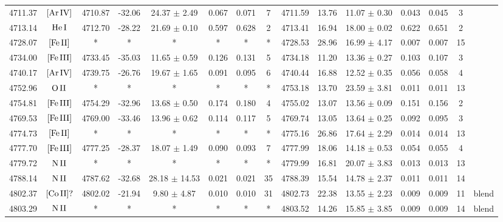 \documentclass{article}
\begin{document}
\begin{table*}
\begin{adjustbox}{width=\textwidth}
\begin{tabular}{ccccccccccccccc}
4711.37 & $\mbox{[Ar}\thinspace \mbox{IV]}$ & 4710.87 & -32.06 & 24.37 $\pm$ 2.49 & 0.067 & 0.071 & 7 & 4711.59 & 13.76 & 11.07 $\pm$ 0.30 & 0.043 & 0.045 & 3 &  \\
4713.14 & $\mbox{He}\thinspace \mbox{I}$ & 4712.70 & -28.22 & 21.69 $\pm$ 0.10 & 0.597 & 0.628 & 2 & 4713.41 & 16.94 & 18.00 $\pm$ 0.02 & 0.622 & 0.651 & 2 &  \\
4728.07 & $\mbox{[Fe}\thinspace \mbox{II]}$ & * & * & * & * & * & * & 4728.53 & 28.96 & 16.99 $\pm$ 4.17 & 0.007 & 0.007 & 15 &  \\
4734.00 & $\mbox{[Fe}\thinspace \mbox{III]}$ & 4733.45 & -35.03 & 11.65 $\pm$ 0.59 & 0.126 & 0.131 & 5 & 4734.18 & 11.20 & 13.36 $\pm$ 0.27 & 0.103 & 0.107 & 3 &  \\
4740.17 & $\mbox{[Ar}\thinspace \mbox{IV]}$ & 4739.75 & -26.76 & 19.67 $\pm$ 1.65 & 0.091 & 0.095 & 6 & 4740.44 & 16.88 & 12.52 $\pm$ 0.35 & 0.056 & 0.058 & 4 &  \\
4752.96 & $\mbox{O}\thinspace \mbox{II}$ & * & * & * & * & * & * & 4753.18 & 13.70 & 23.59 $\pm$ 3.81 & 0.011 & 0.011 & 13 &  \\
4754.81 & $\mbox{[Fe}\thinspace \mbox{III]}$ & 4754.29 & -32.96 & 13.68 $\pm$ 0.50 & 0.174 & 0.180 & 4 & 4755.02 & 13.07 & 13.56 $\pm$ 0.09 & 0.151 & 0.156 & 2 &  \\
4769.53 & $\mbox{[Fe}\thinspace \mbox{III]}$ & 4769.00 & -33.46 & 13.96 $\pm$ 0.62 & 0.114 & 0.117 & 5 & 4769.74 & 13.05 & 13.64 $\pm$ 0.25 & 0.092 & 0.095 & 3 &  \\
4774.73 & $\mbox{[Fe}\thinspace \mbox{II]}$ & * & * & * & * & * & * & 4775.16 & 26.86 & 17.64 $\pm$ 2.29 & 0.014 & 0.014 & 13 &  \\
4777.70 & $\mbox{[Fe}\thinspace \mbox{III]}$ & 4777.25 & -28.37 & 18.07 $\pm$ 1.49 & 0.090 & 0.093 & 7 & 4777.99 & 18.06 & 14.18 $\pm$ 0.53 & 0.054 & 0.055 & 4 &  \\
4779.72 & $\mbox{N}\thinspace \mbox{II}$ & * & * & * & * & * & * & 4779.99 & 16.81 & 20.07 $\pm$ 3.83 & 0.013 & 0.013 & 13 &  \\
4788.14 & $\mbox{N}\thinspace \mbox{II}$ & 4787.62 & -32.68 & 28.18 $\pm$ 14.53 & 0.021 & 0.021 & 35 & 4788.39 & 15.54 & 14.78 $\pm$ 2.37 & 0.011 & 0.011 & 14 &  \\
4802.37 & $\mbox{[Co}\thinspace \mbox{II]?}$ & 4802.02 & -21.94 & 9.80 $\pm$ 4.87 & 0.010 & 0.010 & 31 & 4802.73 & 22.38 & 13.55 $\pm$ 2.23 & 0.009 & 0.009 & 11 &  blend \\
4803.29 & $\mbox{N}\thinspace \mbox{II}$ & * & * & * & * & * & * & 4803.52 & 14.26 & 15.85 $\pm$ 3.85 & 0.009 & 0.009 & 14 &  blend \\

\end{tabular}
\end{adjustbox}
\end{table*}
\end{document}

